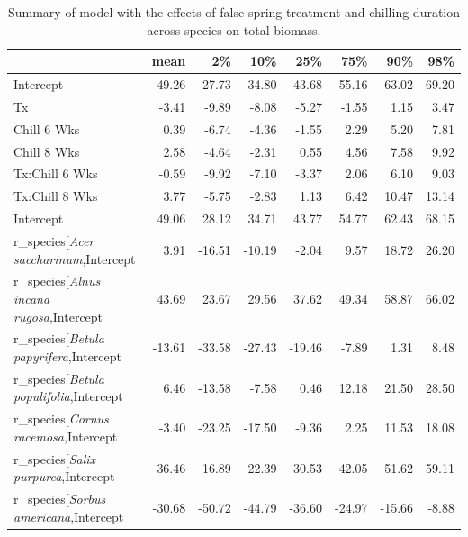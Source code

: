 \documentclass{article}\usepackage[]{graphicx}\usepackage[]{color}
\makeatletter
\newenvironment{kframe}{%
 \def\at@end@of@kframe{}%
 \ifinner\ifhmode%
  \def\at@end@of@kframe{\end{minipage}}%
  \begin{minipage}{\columnwidth}%
 \fi\fi%
 \def\FrameCommand##1{\hskip\@totalleftmargin \hskip-\fboxsep
 \colorbox{shadecolor}{##1}\hskip-\fboxsep
     \hskip-\linewidth \hskip-\@totalleftmargin \hskip\columnwidth}%
 \MakeFramed {\advance\hsize-\width
   \@totalleftmargin\z@ \linewidth\hsize
   \@setminipage}}%
 {\par\unskip\endMakeFramed%
 \at@end@of@kframe}
\makeatother
\begin{document}
\newpage
\begin{kframe}


{\ttfamily\noindent\bfseries\color{errorcolor}{\#\# Error in gsub("{}r\_species["{}, "{}"{}, modoutput\$term): invalid regular expression 'r\_species[', reason 'Missing ']''}}\end{kframe}%
\begin{longtable}{lrrrrrrr}
\caption{Summary of model with the effects of false spring treatment and chilling duration across species on total biomass.} \\ 
  \hline
 & mean & 2\% & 10\% & 25\% & 75\% & 90\% & 98\% \\ 
  \hline \endhead  \hline
Intercept & 49.26 & 27.73 & 34.80 & 43.68 & 55.16 & 63.02 & 69.20 \\ 
  Tx & -3.41 & -9.89 & -8.08 & -5.27 & -1.55 & 1.15 & 3.47 \\ 
  Chill 6 Wks & 0.39 & -6.74 & -4.36 & -1.55 & 2.29 & 5.20 & 7.81 \\ 
  Chill 8 Wks & 2.58 & -4.64 & -2.31 & 0.55 & 4.56 & 7.58 & 9.92 \\ 
  Tx:Chill 6 Wks & -0.59 & -9.92 & -7.10 & -3.37 & 2.06 & 6.10 & 9.03 \\ 
  Tx:Chill 8 Wks & 3.77 & -5.75 & -2.83 & 1.13 & 6.42 & 10.47 & 13.14 \\ 
  Intercept & 49.06 & 28.12 & 34.71 & 43.77 & 54.77 & 62.43 & 68.15 \\ 
  r_species[\textit{Acer saccharinum},Intercept & 3.91 & -16.51 & -10.19 & -2.04 & 9.57 & 18.72 & 26.20 \\ 
  r_species[\textit{Alnus incana rugosa},Intercept & 43.69 & 23.67 & 29.56 & 37.62 & 49.34 & 58.87 & 66.02 \\ 
  r_species[\textit{Betula papyrifera},Intercept & -13.61 & -33.58 & -27.43 & -19.46 & -7.89 & 1.31 & 8.48 \\ 
  r_species[\textit{Betula populifolia},Intercept & 6.46 & -13.58 & -7.58 & 0.46 & 12.18 & 21.50 & 28.50 \\ 
  r_species[\textit{Cornus racemosa},Intercept & -3.40 & -23.25 & -17.50 & -9.36 & 2.25 & 11.53 & 18.08 \\ 
  r_species[\textit{Salix purpurea},Intercept & 36.46 & 16.89 & 22.39 & 30.53 & 42.05 & 51.62 & 59.11 \\ 
  r_species[\textit{Sorbus americana},Intercept & -30.68 & -50.72 & -44.79 & -36.60 & -24.97 & -15.66 & -8.88 \\ 

\end{longtable}
\end{document}
